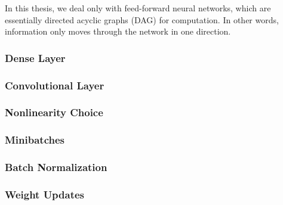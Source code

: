 In this thesis, we deal only with feed-forward neural networks, which are essentially directed acyclic graphs (DAG) for computation. In other words, information only moves through the network in one direction.

\subsubsection{Dense Layer}



\subsubsection{Convolutional Layer}



\subsubsection{Nonlinearity Choice}



\subsubsection{Minibatches}



\subsubsection{Batch Normalization}



\subsubsection{Weight Updates}




